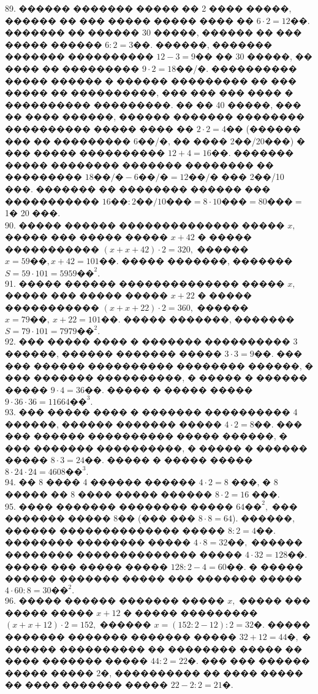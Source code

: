 \documentclass[12pt]{article}
\begin{document}
89. ������ ������� ����� �� 2 ���� �����, ������ �� ��� ����� ����� ���� �� $6\cdot2=12$��. ������� �� ������ 30 �����, ������ �� ��� ����� ������ $6:2=3$��. ������, ������� ������� ���������� $12-3=9$�� �� 30 �����, �� ���� �� ��������� $9\cdot2=18$��/�. ���������� ����� ������ � ������ ��������� �� ��� ����� �� ����������, ��� ��� ��� ���� � ���������� ���������. �� �� 40 �����, ��� �� ���� ������, ������ ������� �������� ���������� ����� ���� �� $2\cdot2=4$�� (������ ��� �� ��������� 6��/�, �� ���� 2��/20���) � ��� ����� ���������� $12+4=16$��. ������� ����� �������� ������� �������� �� ��������� $18\text{��/�}-6\text{��/�}=12\text{��/�}$ ��� 2��/10 ���. ������� �� �������� ������ ��� ����������� $16\text{��}:2\text{��/10���}=8\cdot10\text{���}=80\text{���}=$1� 20 ���.\\
90. ����� ������ �������������� ����� $x,$ ����� ��� ����� ����� $x+42$ � ����� ����������� $(x+x+42)\cdot2=320,$ ������ $x=59\text{��}, x+42=101\text{��}.$ ����� �������, �������
$S=59\cdot101=5959\text{��}^2.$\\
91. ����� ������ �������������� ����� $x,$ ����� ��� ����� ����� $x+22$ � ����� ����������� $(x+x+22)\cdot2=360,$ ������ $x=79\text{��},\ x+22=101\text{��}.$ ����� �������, �������
$S=79\cdot101=7979\text{��}^2.$\\
92. ��� ����� ���� � ������� ���������� 3 ������, ������ ������� ����� $3\cdot3=9$��. ��� ��� ������ ���������� �������� ������, � ��� ������� ����������, � ����� � ������ ����� $9\cdot4=36$��. ����� � ����� ����� $9\cdot36\cdot36=11664\text{��}^3.$\\
93. ��� ����� ���� � ������� ���������� 4 ������, ������ ������� ����� $4\cdot2=8$��. ��� ��� ������ ���������� ����� ������, � ��� ������� ����������, � ����� � ������ ����� $8\cdot3=24$��. ����� � ����� ����� $8\cdot24\cdot24=4608\text{��}^3.$\\
94. �� 8 ���� 4 ������ ������ $4\cdot2=8$ ���, � 8 ����� �� 8 ���� ����� ������ $8\cdot2=16$ ���.\\
95. ���� ������� �������� ����� $64\text{��}^2,$ ��� ������� ����� $8\text{��}$ (��� ��� $8\cdot8=64$). ������, ������ �������������� ����� $8:2=4\text{��}.$ �������� �������� ����� $4\cdot8=32\text{��},$ ������ �������� �������������� ����� $4\cdot32=128$��. ����� ��� ����� ����� $128:2-4=60$��. � ����� ������ �������
����� ��� ������� ����� $4\cdot60:8=30\text{��}^2.$\\
96. ����� ������ ������� ����� $x,$ ����� ��� ����� ����� $x+12$ � ����� ��������� $(x+x+12)\cdot2=152,$ ������ $x=(152:2-12):2=32\text{�}.$ ����� ������� ������� ������� ����� $32+12=44\text{�},$ � ������ ���������� �� �������� ����� �� ���� ������� ����� $44:2=22\text{�}.$ ��� ��� ������ ����� ����� 2�, ���������� �� ���� ����� �� ���� ������� ����� $22-2:2=21\text{�}.$\\
\end{document}
